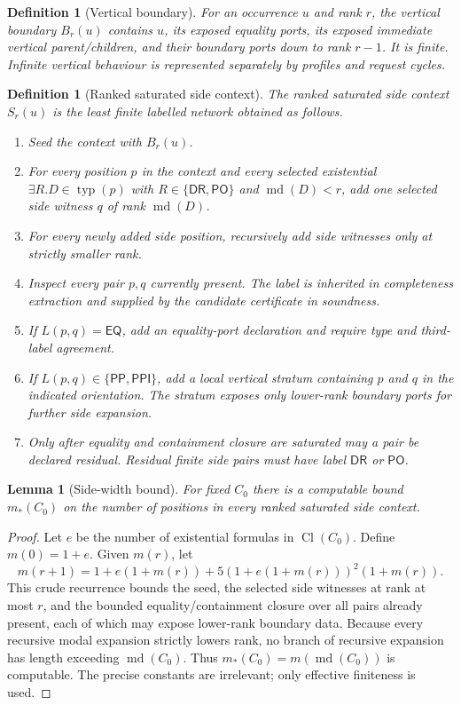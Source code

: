 \documentclass[11pt]{article}
\newtheorem{lemma}[theorem]{Lemma}
\newtheorem{definition}[theorem]{Definition}
\newcommand{\EQ}{\mathsf{EQ}}
\newcommand{\DR}{\mathsf{DR}}
\newcommand{\PO}{\mathsf{PO}}
\newcommand{\PP}{\mathsf{PP}}
\newcommand{\PPI}{\mathsf{PPI}}
\newcommand{\Cl}{\operatorname{Cl}}
\newcommand{\md}{\operatorname{md}}
\newcommand{\typ}{\operatorname{typ}}
\begin{document}
\begin{definition}[Vertical boundary]
For an occurrence $u$ and rank $r$, the vertical boundary $B_r(u)$ contains $u$, its exposed equality ports, its exposed immediate vertical parent/children, and their boundary ports down to rank $r-1$.  It is finite.  Infinite vertical behaviour is represented separately by profiles and request cycles.
\end{definition}

\begin{definition}[Ranked saturated side context]
\label{def:ranked-side}
The ranked saturated side context $S_r(u)$ is the least finite labelled network obtained as follows.
\begin{enumerate}[label=(S\arabic*)]
\item Seed the context with $B_r(u)$.
\item For every position $p$ in the context and every selected existential $\exists R.D\in\typ(p)$ with $R\in\{\DR,\PO\}$ and $\md(D)<r$, add one selected side witness $q$ of rank $\md(D)$.
\item For every newly added side position, recursively add side witnesses only at strictly smaller rank.
\item Inspect every pair $p,q$ currently present.  The label is inherited in completeness extraction and supplied by the candidate certificate in soundness.
\item If $L(p,q)=\EQ$, add an equality-port declaration and require type and third-label agreement.
\item If $L(p,q)\in\{\PP,\PPI\}$, add a local vertical stratum containing $p$ and $q$ in the indicated orientation.  The stratum exposes only lower-rank boundary ports for further side expansion.
\item Only after equality and containment closure are saturated may a pair be declared residual.  Residual finite side pairs must have label $\DR$ or $\PO$.
\end{enumerate}
\end{definition}

\begin{lemma}[Side-width bound]
\label{lem:side-width}
For fixed $C_0$ there is a computable bound $m_*(C_0)$ on the number of positions in every ranked saturated side context.
\end{lemma}

\begin{proof}
Let $e$ be the number of existential formulas in $\Cl(C_0)$.  Define $m(0)=1+e$.  Given $m(r)$, let
\[
 m(r+1)=1+e(1+m(r))+5(1+e(1+m(r)))^2(1+m(r)).
\]
This crude recurrence bounds the seed, the selected side witnesses at rank at most $r$, and the bounded equality/containment closure over all pairs already present, each of which may expose lower-rank boundary data.  Because every recursive modal expansion strictly lowers rank, no branch of recursive expansion has length exceeding $\md(C_0)$.  Thus $m_*(C_0)=m(\md(C_0))$ is computable.  The precise constants are irrelevant; only effective finiteness is used.
\end{proof}
\end{document}
